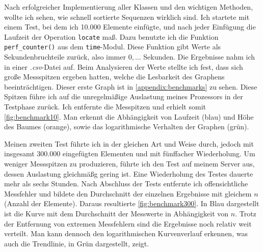 Nach erfolgreicher Implementierung aller Klassen und den wichtigen Methoden, wollte ich sehen, wie schnell sortierte Sequenzen wirklich sind. Ich startete mit einem Test, bei dem ich 10.000 Elemente einfügte, und nach jeder Einfügung die Laufzeit der Operation \texttt{locate} maß. Dazu benutzte ich die Funktion \texttt{perf\_counter()} aus dem \texttt{time}-Modul. Diese Funktion gibt Werte als Sekundenbruchteile zurück, also immer $0,\dots$ Sekunden. Die Ergebnisse nahm ich in einer \textit{.csv}-Datei auf. Beim Analysieren der Werte stellte ich fest, dass sich große Messspitzen ergeben hatten, welche die Lesbarkeit des Graphens beeinträchtigen. Dieser erste Graph ist in \autoref{appendix:benchmarks} zu sehen. Diese Spitzen führe ich auf die unregelmäßige Auslastung meines Prozessors in der Testphase zurück. Ich entfernte die Messpitzen und erhielt somit \autoref{fig:benchmark10}. Man erkennt die Abhängigkeit von Laufzeit (blau) und Höhe des Baumes (orange), sowie das logarithmische Verhalten der Graphen (grün).
\par
Meinen zweiten Test führte ich in der gleichen Art und Weise durch, jedoch mit insgesamt 300.000 eingefügten Elementen und mit fünffacher Wiederholung. Um weniger Messspitzen zu produzieren, führte ich den Test auf meinem Server aus, dessen Auslastung gleichmäßg gering ist. Eine Wiederholung des Testes dauerte mehr als sechs Stunden. Nach Abschluss der Tests entfernte ich offensichtliche Messfehler und bildete den Durchschnitt der einzelnen Ergebnisse mit gleichem $n$ (Anzahl der Elemente). Daraus resultierte \autoref{fig:benchmark300}. In Blau dargestellt ist die Kurve mit dem Durchschnitt der Messwerte in Abhängigkeit von $n$. Trotz der Entfernung von extremen Messfehlern sind die Ergebnisse noch relativ weit verteilt. Man kann dennoch den logarithmischen Kurvenverlauf erkennen, was auch die Trendlinie, in Grün dargestellt, zeigt.

\begin{figure}
\end{figure}

